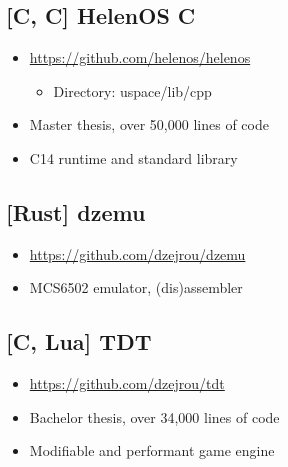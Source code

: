 \documentclass[8pt]{article}
\def\cpp{{C\nolinebreak[4]\hspace{-.05em}\raisebox{.4ex}{\tiny\bf ++\xspace}}}
\begin{document}
\begin{minipage}[t]{0.45\textwidth}
\centering

\subsection*{[C, \cpp] HelenOS \cpp}
\begin{itemize}
    \item \url{https://github.com/helenos/helenos}
    \begin{itemize}
        \item Directory: uspace/lib/cpp
    \end{itemize}
    \item Master thesis, over 50,000 lines of code
    \item \cpp14 runtime and standard library
\end{itemize}

\subsection*{[Rust] dzemu}
\begin{itemize}
    \item \url{https://github.com/dzejrou/dzemu}
    \item MCS6502 emulator, (dis)assembler
\end{itemize}

\subsection*{[\cpp, Lua] TDT}
\begin{itemize}
    \item \url{https://github.com/dzejrou/tdt}
    \item Bachelor thesis, over 34,000 lines of code
    \item Modifiable and performant game engine
\end{itemize}

\end{minipage}%
\hfill
\end{document}
